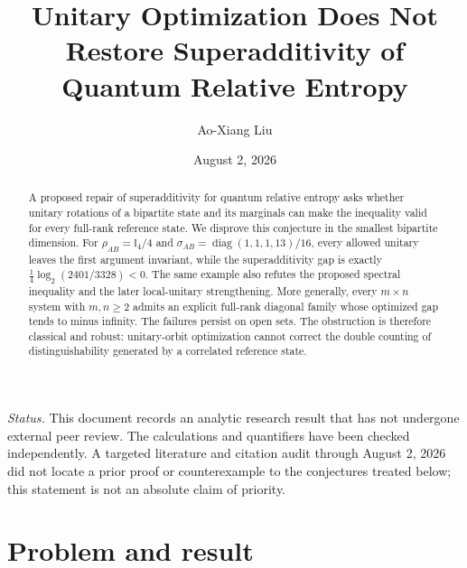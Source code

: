 \documentclass[
  aps,
  pra,
  reprint,
  superscriptaddress,
  nofootinbib,
  longbibliography
]{revtex4-2}
\theoremstyle{remark}
\newcommand{\identity}{\mathbb{I}}
\newcommand{\diag}{\operatorname{diag}}
\begin{document}
\title{Unitary Optimization Does Not Restore Superadditivity of Quantum Relative Entropy}
\author{Ao-Xiang Liu}
\noaffiliation
\date{August 2, 2026}

\begin{abstract}
A proposed repair of superadditivity for quantum relative entropy asks
whether unitary rotations of a bipartite state and its marginals can make
the inequality valid for every full-rank reference state.  We disprove this
conjecture in the smallest bipartite dimension.  For
$\rho_{AB}=\identity_4/4$ and
$\sigma_{AB}=\diag(1,1,1,13)/16$, every allowed unitary leaves the first
argument invariant, while the superadditivity gap is exactly
$\frac14\log_2(2401/3328)<0$.  The same example also refutes the proposed
spectral inequality and the later local-unitary strengthening.  More
generally, every $m\times n$ system with $m,n\geq2$ admits an explicit
full-rank diagonal family whose optimized gap tends to minus infinity.
The failures persist on open sets.  The obstruction is therefore classical
and robust: unitary-orbit optimization cannot correct the double counting of
distinguishability generated by a correlated reference state.
\end{abstract}

\maketitle

\noindent\textit{Status.}\quad
This document records an analytic research result that has not undergone
external peer review.  The calculations and quantifiers have been checked
independently.  A targeted literature and citation audit through August 2,
2026 did not locate a prior proof or counterexample to the conjectures
treated below; this statement is not an absolute claim of priority.

\section{Problem and result}
\end{document}
